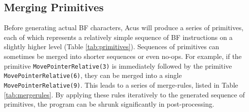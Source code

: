 \subsection{Merging Primitives}
Before generating actual BF characters, Acus will produce a series of primitives, each of which represents a relatively simple sequence of BF instructions on a slightly higher level (Table \ref{tab:primitives}). Sequences of primitives can sometimes be merged into shorter sequences or even no-ops. For example, if the primitive \texttt{MovePointerRelative(3)} is immediately followed by the primitive \texttt{MovePointerRelative(6)}, they can be merged into a single \texttt{MovePointerRelative(9)}. This leads to a series of merge-rules, listed in Table \ref{tab:mergerules}. By applying these rules iteratively to the generated sequence of primitives, the program can be shrunk significantly in post-processing.


